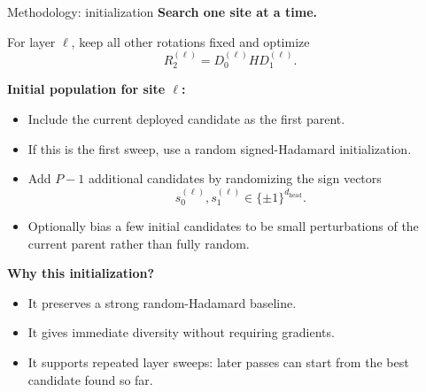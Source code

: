 \documentclass[aspectratio=169,11pt]{beamer}
\begin{document}
\begin{frame}{Methodology: initialization}
\textbf{Search one site at a time.}

\vspace{0.2cm}
For layer $\ell$, keep all other rotations fixed and optimize
\[
R_2^{(\ell)} = D_0^{(\ell)} H D_1^{(\ell)}.
\]

\vspace{0.2cm}
\textbf{Initial population for site $\ell$:}
\begin{itemize}
  \item Include the current deployed candidate as the first parent.
  \item If this is the first sweep, use a random signed-Hadamard initialization.
  \item Add $P-1$ additional candidates by randomizing the sign vectors
  \[
  s_0^{(\ell)}, s_1^{(\ell)} \in \{\pm 1\}^{d_{\mathrm{head}}}.
  \]
  \item Optionally bias a few initial candidates to be small perturbations of the current parent rather than fully random.
\end{itemize}

\vspace{0.2cm}
\textbf{Why this initialization?}
\begin{itemize}
  \item It preserves a strong random-Hadamard baseline.
  \item It gives immediate diversity without requiring gradients.
  \item It supports repeated layer sweeps: later passes can start from the best candidate found so far.
\end{itemize}
\end{frame}
\end{document}
